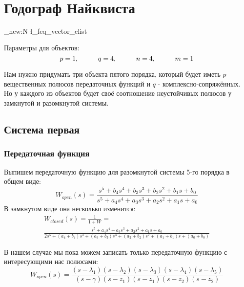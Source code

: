 \chapter{Годограф Найквиста}
\label{ch:chap1}
\newcommand\tab[1][1cm]{\hspace*{#1}}

\ExplSyntaxOn
\clist_new:N \l_feq_vector_clist
\ExplSyntaxOff

Параметры для объектов:
$$
  p=1, \tab q=4, \tab n=4, \tab m=1
$$

Нам нужно придумать три объекта пятого порядка, который будет иметь $p$ вещественных полюсов передаточных функций и $q$ - комплексно-сопряжённых. 
Но у каждого из объектов будет своё соотношение неустойчивых полюсов у замкнутой и разомкнутой системы.

\section{Система первая}

\subsection{Передаточная функция}

Выпишем передаточную функцию для разомкнутой системы 5-го порядка в общем виде:
$$
W_{open}(s) = \frac{s^5 + b_4s^4 + b_3s^3 + b_2s^2 + b_1s + b_0}{s^5 + a_4s^4 + a_3s^3 + a_2s^2 + a_1s + a_0}
$$
В замкнутом виде она несколько изменится:
$$
\begin{aligned}
  W_{closed}(s) = \frac{1}{1+W} =\\ 
  \frac{s^5 + a_4s^4 + a_3s^3 + a_2s^2 + a_1s + a_0}{2s^5 + (a_4 + b_4)s^4 + (a_3 + b_3)s^3 + (a_2 + b_2)s^2 + (a_1 + b_1)s + (a_0 + b_0)}
\end{aligned}
$$

В нашем случае мы пока можем записать только передаточную функцию с интересующими нас полюсами:
$$
W_{open}(s) = \frac{(s-\lambda_1)(s-\lambda_2)(s-\lambda_3)(s-\lambda_4)(s-\lambda_5)}{(s-\gamma)(s-z_1)(s-\overline{z}_1)(s-z_2)(s-\overline{z}_2)}
$$

